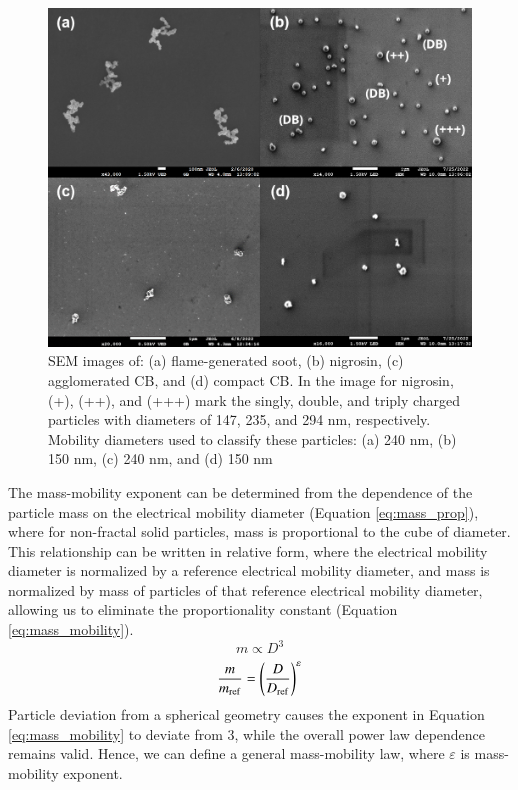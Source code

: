 \documentclass[12pt,authoryear]{elsarticle}
\begin{document}
\begin{figure}[htp]
\centering
\includegraphics[width=\textwidth]{fig_sem.png}
\caption{SEM images of: (a) flame-generated soot, (b) nigrosin, (c) agglomerated CB, and (d) compact CB. In the image for nigrosin, (+), (++), and (+++) mark the singly, double, and triply charged particles with diameters of 147, 235, and 294 nm, respectively. Mobility diameters used to classify these particles: (a) 240 nm, (b) 150 nm, (c) 240 nm, and (d) 150 nm}
\label{fig:sem}
\end{figure}

The mass-mobility exponent can be determined from the dependence of the particle mass on the electrical mobility diameter (Equation \ref{eq:mass_prop}), where for non-fractal solid particles, mass is proportional to the cube of diameter. This relationship can be written in relative form, where the electrical mobility diameter is normalized by a reference electrical mobility diameter, and mass is normalized by mass of particles of that reference electrical mobility diameter, allowing us to eliminate the proportionality constant (Equation \ref{eq:mass_mobility}).
\begin{equation}
    \label{eq:mass_prop}
    m\propto D^3
\end{equation}
\begin{equation}
    \label{eq:mass_mobility}
    \frac{m}{m_{\rm ref}}=\left(\frac{D}{D_{\rm ref}}\right)^\varepsilon
\end{equation}
Particle deviation from a spherical geometry causes the exponent in Equation \ref{eq:mass_mobility} to deviate from 3, while the overall power law dependence remains valid. Hence, we can define a general mass-mobility law, where $\varepsilon$ is mass-mobility exponent.
\end{document}
